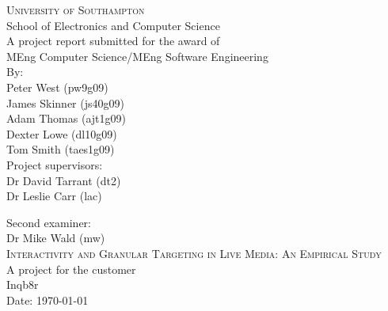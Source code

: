 
\begin{titlepage}

\begin{center}

\textsc{\large{University of Southampton}}\\[0.0cm]

\large{School of Electronics and Computer Science}\\[2.0cm]

\large{A project report submitted for the award of}\\[0.0cm]

\large{MEng Computer Science/MEng Software Engineering}\\[2.0cm]

\large{
	By: \\
	Peter West (pw9g09) \\
	James Skinner (js40g09) \\
	Adam Thomas (ajt1g09) \\
	Dexter Lowe (dl10g09) \\
	Tom Smith (taes1g09)}\\[2.0cm]

\large{Project supervisors: \\
		Dr David Tarrant (dt2) \\
		Dr Leslie Carr (lac)}

\large{Second examiner: \\
		Dr Mike Wald (mw)}\\[2.0cm]


\textsc{\large Interactivity and Granular Targeting in Live Media: An Empirical Study}\\[2.0cm]

\large{A project for the customer \\
		Inqb8r}\\[2.0cm]

\large{Date: \today}\\[4.0cm]

\end{center}

\end{titlepage}

